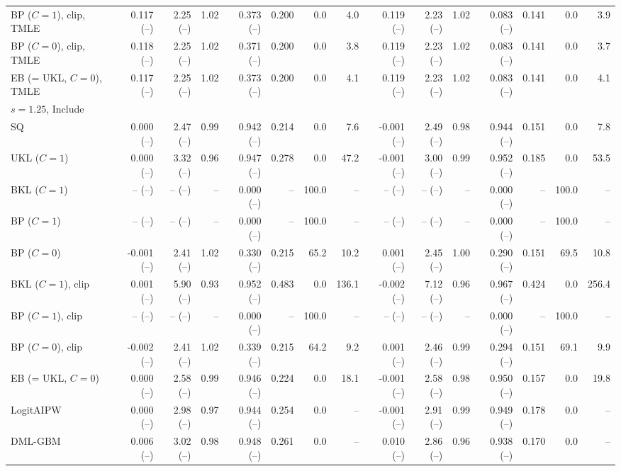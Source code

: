\begin{tabular}{lrrrrrrrrrrrrrr}
BP ($C=1$), clip, TMLE & 0.117 (--) & 2.25 (--) & 1.02 & 0.373 (--) & 0.200 & 0.0 & 4.0 & 0.119 (--) & 2.23 (--) & 1.02 & 0.083 (--) & 0.141 & 0.0 & 3.9 \\
BP ($C=0$), clip, TMLE & 0.118 (--) & 2.25 (--) & 1.02 & 0.371 (--) & 0.200 & 0.0 & 3.8 & 0.119 (--) & 2.23 (--) & 1.02 & 0.083 (--) & 0.141 & 0.0 & 3.7 \\
EB (= UKL, $C=0$), TMLE & 0.117 (--) & 2.25 (--) & 1.02 & 0.373 (--) & 0.200 & 0.0 & 4.1 & 0.119 (--) & 2.23 (--) & 1.02 & 0.083 (--) & 0.141 & 0.0 & 4.1 \\
\multicolumn{15}{l}{$s=1.25$, Include} \\
SQ & 0.000 (--) & 2.47 (--) & 0.99 & 0.942 (--) & 0.214 & 0.0 & 7.6 & -0.001 (--) & 2.49 (--) & 0.98 & 0.944 (--) & 0.151 & 0.0 & 7.8 \\
UKL ($C=1$) & 0.000 (--) & 3.32 (--) & 0.96 & 0.947 (--) & 0.278 & 0.0 & 47.2 & -0.001 (--) & 3.00 (--) & 0.99 & 0.952 (--) & 0.185 & 0.0 & 53.5 \\
BKL ($C=1$) & -- (--) & -- (--) & -- & 0.000 (--) & -- & 100.0 & -- & -- (--) & -- (--) & -- & 0.000 (--) & -- & 100.0 & -- \\
BP ($C=1$) & -- (--) & -- (--) & -- & 0.000 (--) & -- & 100.0 & -- & -- (--) & -- (--) & -- & 0.000 (--) & -- & 100.0 & -- \\
BP ($C=0$) & -0.001 (--) & 2.41 (--) & 1.02 & 0.330 (--) & 0.215 & 65.2 & 10.2 & 0.001 (--) & 2.45 (--) & 1.00 & 0.290 (--) & 0.151 & 69.5 & 10.8 \\
BKL ($C=1$), clip & 0.001 (--) & 5.90 (--) & 0.93 & 0.952 (--) & 0.483 & 0.0 & 136.1 & -0.002 (--) & 7.12 (--) & 0.96 & 0.967 (--) & 0.424 & 0.0 & 256.4 \\
BP ($C=1$), clip & -- (--) & -- (--) & -- & 0.000 (--) & -- & 100.0 & -- & -- (--) & -- (--) & -- & 0.000 (--) & -- & 100.0 & -- \\
BP ($C=0$), clip & -0.002 (--) & 2.41 (--) & 1.02 & 0.339 (--) & 0.215 & 64.2 & 9.2 & 0.001 (--) & 2.46 (--) & 0.99 & 0.294 (--) & 0.151 & 69.1 & 9.9 \\
EB (= UKL, $C=0$) & 0.000 (--) & 2.58 (--) & 0.99 & 0.946 (--) & 0.224 & 0.0 & 18.1 & -0.001 (--) & 2.58 (--) & 0.98 & 0.950 (--) & 0.157 & 0.0 & 19.8 \\
LogitAIPW & 0.000 (--) & 2.98 (--) & 0.97 & 0.944 (--) & 0.254 & 0.0 & -- & -0.001 (--) & 2.91 (--) & 0.99 & 0.949 (--) & 0.178 & 0.0 & -- \\
DML-GBM & 0.006 (--) & 3.02 (--) & 0.98 & 0.948 (--) & 0.261 & 0.0 & -- & 0.010 (--) & 2.86 (--) & 0.96 & 0.938 (--) & 0.170 & 0.0 & -- \\

\end{tabular}
